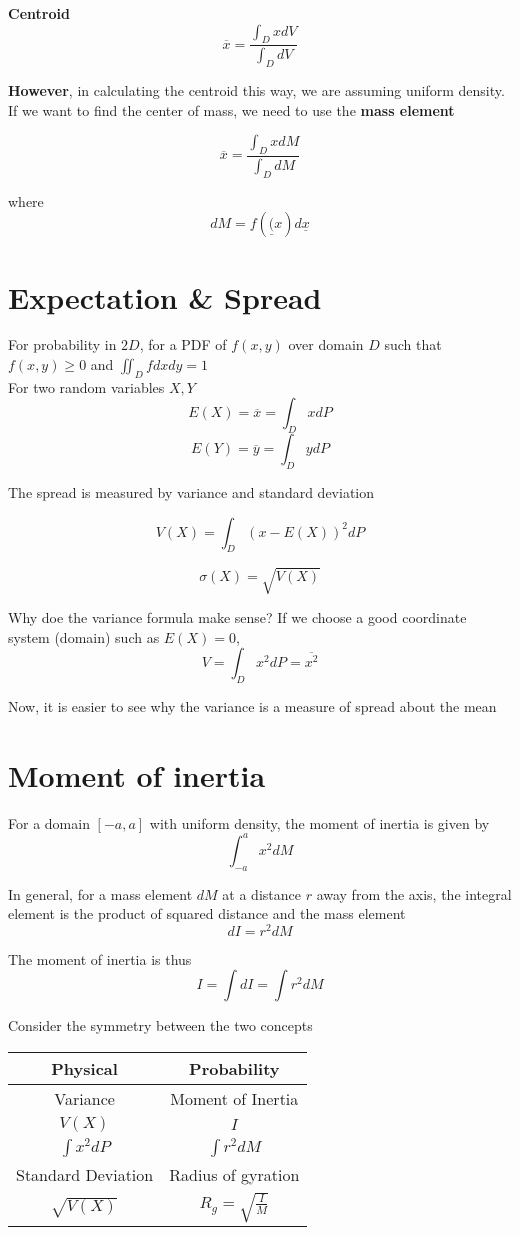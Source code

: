 \textbf{Centroid}
\[
   \overline{x} = \frac{\int_{D} x dV}{\int_{D} dV}
\] 

\textbf{However}, in calculating the centroid this way, we are assuming uniform density. If we want to find the center of mass, we need to use the \textbf{mass element}

\[
   \overline{x} = \frac{\int_{D} x dM}{\int_{D} dM}
\] 

where 
\[
  dM = f( \underline(x) d \underline{x}
\] 

\section{Expectation \& Spread}

For probability in $2D$, for a PDF of $f(x,y)$ over domain  $D$ such that $f(x,y) \geq 0$ and  $\iint_{D} f dxdy = 1$ \\

For two random variables $X, Y$ 
\[
   E(X) = \overline{x}  = \int_{D} x dP
\] 
\[
   E(Y) = \overline{y}  = \int_{D} y dP
\]  

The spread is measured by variance and standard deviation

\[
   V(X) = \int_{D} (x - E(X))^2 dP
\] 

\[
  \sigma(X) = \sqrt{V(X)}
\] 

Why doe the variance formula make sense? If we choose a good coordinate system (domain)  such as $E(X) = 0$, 
\[
   V = \int_{D} x^2 dP = \overline{x^2}
\] 

Now, it is easier to see why the variance is a measure of spread about the mean

\section{Moment of inertia}

For a domain $[-a, a]$ with uniform density, the moment of inertia is given by
\[
   \int_{-a}^{a} x^2 dM
\] 

In general, for a mass element $dM$ at a distance $r$ away from the axis, the integral element is the product of squared distance and the mass element
\[
  dI = r^2 dM
\] 

The moment of inertia is thus
\[
  I = \int dI = \int r^2 dM
\] 

Consider the symmetry between the two concepts \\
\begin{center}
   \begin{tabular}{|c | c|}
      \hline
      Physical & Probability \\ 
      \hline
      Variance & Moment of Inertia \\
      $V(X)$ & $I$ \\
      $\int x^2 dP$ & $\int r^2 dM$ \\
      \hline
      Standard Deviation & Radius of gyration \\
      $\sqrt{V(X)}$ & $R_g = \sqrt{ \frac{I}{M}}$ \\
      \hline
   \end{tabular}
\end{center}

